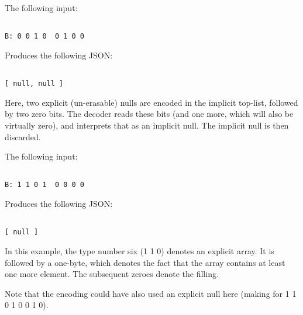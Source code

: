 The following input:

\begin{changemargin}{-60mm}{0mm}
\begin{myquote}
\begin{verbatim}

B: 0 0 1 0  0 1 0 0

\end{verbatim}
\end{myquote}
\end{changemargin}

Produces the following JSON:

\begin{changemargin}{-60mm}{0mm}
\begin{myquote}
\begin{verbatim}

[ null, null ]

\end{verbatim}
\end{myquote}
\end{changemargin}

Here, two explicit (un-erasable) nulls are encoded in the implicit
top-list, followed by two zero bits. The decoder reads these bits
(and one more, which will also be virtually zero), and interprets that
as an implicit null. The implicit null is then discarded.

The following input:

\begin{changemargin}{-60mm}{0mm}
\begin{myquote}
\begin{verbatim}

B: 1 1 0 1  0 0 0 0

\end{verbatim}
\end{myquote}
\end{changemargin}

Produces the following JSON:

\begin{changemargin}{-60mm}{0mm}
\begin{myquote}
\begin{verbatim}

[ null ]

\end{verbatim}
\end{myquote}
\end{changemargin}

In this example, the type number six (1 1 0) denotes an explicit array.
It is followed by a one-byte, which denotes the fact that the array
contains at least one more element. The subsequent zeroes denote the filling.

Note that the encoding could have also used an explicit null here
(making for 1 1 0 1  0 0 1 0).
